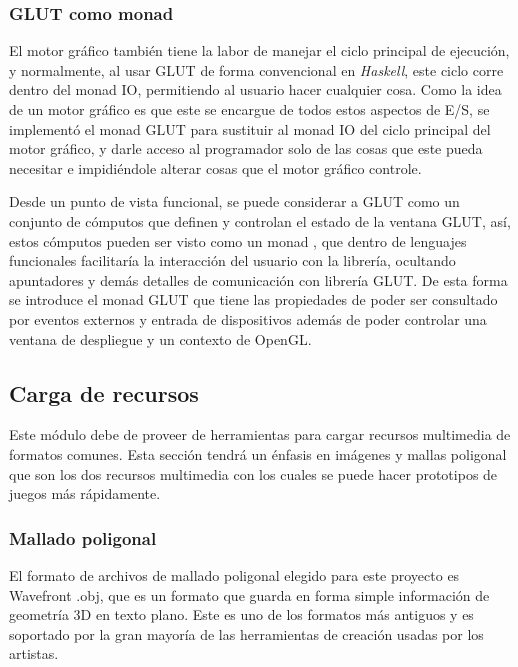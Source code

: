 \subsubsection{GLUT como monad}

El motor gráfico también tiene la labor de manejar el ciclo principal de ejecución, y normalmente, al usar GLUT de forma convencional en \emph{Haskell}, este ciclo corre dentro del monad IO, permitiendo al usuario hacer cualquier cosa. Como la idea de un motor gráfico es que este se encargue de todos estos aspectos de E/S, se implementó el monad GLUT para sustituir al monad IO del ciclo principal del motor gráfico, y darle acceso al programador solo de las cosas que este pueda necesitar e impidiéndole alterar cosas que el motor gráfico controle.

Desde un punto de vista funcional, se puede considerar a GLUT como  un conjunto de cómputos que definen y controlan el estado de la ventana GLUT, así, estos cómputos pueden ser visto como un monad \cite{moggi1991notions} \cite{wiki:MonadsComputation} \cite{wiki:MonadsContainers}, que dentro de lenguajes funcionales facilitaría la interacción del usuario con la librería, ocultando apuntadores y demás detalles de comunicación con librería GLUT. De esta forma se introduce el monad GLUT que tiene las propiedades de poder ser consultado por eventos externos y entrada de dispositivos además de poder controlar una ventana de despliegue y un contexto de OpenGL.

\subsection{Carga de recursos}

Este módulo debe de proveer de herramientas para cargar recursos multimedia de formatos comunes. Esta sección tendrá un énfasis en imágenes y mallas poligonal que son los dos recursos multimedia con los cuales se puede hacer prototipos de juegos más rápidamente.

\subsubsection{Mallado poligonal}

El formato de archivos de mallado poligonal elegido para este proyecto es Wavefront .obj, que es un formato que guarda en forma simple información de geometría 3D en texto plano. Este es uno de los formatos más antiguos y es soportado por la gran mayoría de las herramientas de creación usadas por los artistas.

